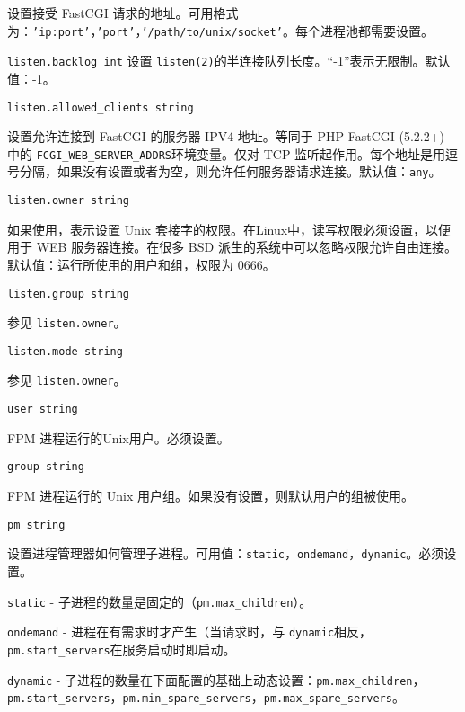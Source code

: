 \begin{compactenum}
\begin{compactitem}
设置接受 FastCGI 请求的地址。可用格式为：\texttt{'ip:port'}，\texttt{'port'}，\texttt{'/path/to/unix/socket'}。每个进程池都需要设置。

\item \texttt{listen.backlog int}
设置 \texttt{listen(2)}的半连接队列长度。“-1”表示无限制。默认值：-1。

\item \texttt{listen.allowed\_clients string}

设置允许连接到 FastCGI 的服务器 IPV4 地址。等同于 PHP FastCGI (5.2.2+) 中的 \texttt{FCGI\_WEB\_SERVER\_ADDRS}环境变量。仅对 TCP 监听起作用。每个地址是用逗号分隔，如果没有设置或者为空，则允许任何服务器请求连接。默认值：\texttt{any}。

\item \texttt{listen.owner string}

如果使用，表示设置 Unix 套接字的权限。在Linux中，读写权限必须设置，以便用于 WEB 服务器连接。在很多 BSD 派生的系统中可以忽略权限允许自由连接。默认值：运行所使用的用户和组，权限为 0666。

\item \texttt{listen.group string}

参见 \texttt{listen.owner}。

\item \texttt{listen.mode string}

参见 \texttt{listen.owner}。

\item \texttt{user string}

FPM 进程运行的Unix用户。必须设置。

\item \texttt{group string}

FPM 进程运行的 Unix 用户组。如果没有设置，则默认用户的组被使用。

\item \texttt{pm string}

设置进程管理器如何管理子进程。可用值：\texttt{static}，\texttt{ondemand}，\texttt{dynamic}。必须设置。

\begin{compactitem}
\item \texttt{static} - 子进程的数量是固定的（\texttt{pm.max\_children}）。
\item \texttt{ondemand} - 进程在有需求时才产生（当请求时，与 \texttt{dynamic}相反，\texttt{pm.start\_servers}在服务启动时即启动。
\item \texttt{dynamic} - 子进程的数量在下面配置的基础上动态设置：\texttt{pm.max\_children}，\texttt{pm.start\_servers}，\texttt{pm.min\_spare\_servers}，\texttt{pm.max\_spare\_servers}。
\end{compactitem}



\end{compactitem}
\end{compactenum}
